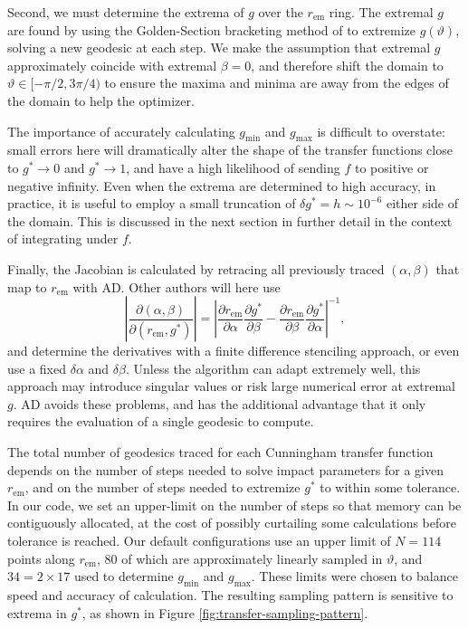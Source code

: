 \documentclass[fleqn,usenatbib]{mnras}
\newcommand{\pderiv}[2]{\frac{\partial #1}{\partial #2}}
\newcommand{\rhoem}{r_\text{em}}
\begin{document}
Second, we must determine the extrema of $g$ over the $\rhoem$ ring. The
extremal $g$ are found by using the Golden-Section bracketing method of
\cite{Optim.jl-2018} to extremize $g(\vartheta)$, solving a new geodesic at each
step. We make the assumption that extremal $g$ approximately coincide with
extremal $\beta = 0$, and therefore shift the domain to $\vartheta \in [ -\pi/2,
3\pi/4)$ to ensure the maxima and minima are away from the edges of the domain
to help the optimizer.

The importance of accurately calculating $g_\text{min}$ and $g_\text{max}$ is
difficult to overstate: small errors here will dramatically alter the shape of
the transfer functions close to $g^\ast \rightarrow 0$ and $g^\ast \rightarrow
1$, and have a high likelihood of sending $f$ to positive or negative infinity.
Even when the extrema are determined to high accuracy, in practice, it is useful
to employ a small truncation of $\delta g^\ast = h \sim 10^{-6}$ either side of
the domain. This is discussed in the next section in further detail in the
context of integrating under $f$.

Finally, the Jacobian is calculated by retracing all previously traced $(\alpha,
\beta)$ that map to $\rhoem$ with AD. Other authors will here use
\begin{equation}
    \left\lvert
    \pderiv{(\alpha, \beta)}{(\rhoem, g^\ast)}
    \right\rvert
    =
    \left\lvert
    \pderiv{\rhoem}{\alpha}\pderiv{g^\ast}{\beta}
    -
    \pderiv{\rhoem}{\beta}\pderiv{g^\ast}{\alpha}
    \right\rvert^{-1},
\end{equation}
and determine the derivatives with a finite difference stenciling approach, or
even use a fixed $\delta \alpha$ and $\delta \beta$. Unless the algorithm can
adapt extremely well, this approach may introduce singular values or risk large
numerical error at extremal $g$. AD avoids these problems, and has the
additional advantage that it only requires the evaluation of a single geodesic
to compute.

The total number of geodesics traced for each Cunningham transfer function
depends on the number of steps needed to solve impact parameters for a given
$\rhoem$, and on the number of steps needed to extremize $g^\ast$ to within
some tolerance. In our code, we set an upper-limit on the number of steps so
that memory can be contiguously allocated, at the cost of possibly curtailing
some calculations before tolerance is reached. Our default configurations use an
upper limit of $N = 114$ points along $\rhoem$, $80$ of which are
approximately linearly sampled in $\vartheta$, and $34 = 2 \times 17$ used to
determine $g_\text{min}$ and $g_\text{max}$. These limits were chosen to balance
speed and accuracy of calculation. The resulting sampling pattern is sensitive
to extrema in $g^\ast$, as shown in Figure \ref{fig:transfer-sampling-pattern}.
\end{document}

